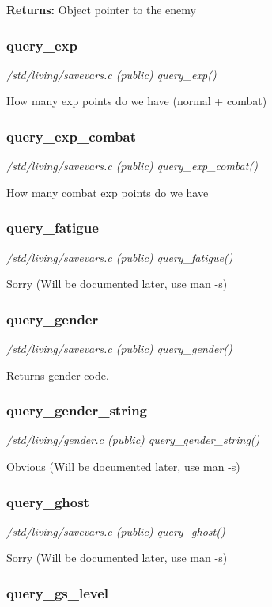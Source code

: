 {\bf Returns:}        Object pointer to the enemy


\subsubsection{query\_exp}

{\em /std/living/savevars.c (public) query\_exp()}

How many exp points do we have (normal + combat)


\subsubsection{query\_exp\_combat}

{\em /std/living/savevars.c (public) query\_exp\_combat()}

How many combat exp points do we have


\subsubsection{query\_fatigue}

{\em /std/living/savevars.c (public) query\_fatigue()}

Sorry (Will be documented later, use man -s)


\subsubsection{query\_gender}

{\em /std/living/savevars.c (public) query\_gender()}

Returns gender code.


\subsubsection{query\_gender\_string}

{\em /std/living/gender.c (public) query\_gender\_string()}

Obvious (Will be documented later, use man -s)


\subsubsection{query\_ghost}

{\em /std/living/savevars.c (public) query\_ghost()}

Sorry (Will be documented later, use man -s)


\subsubsection{query\_gs\_level}

